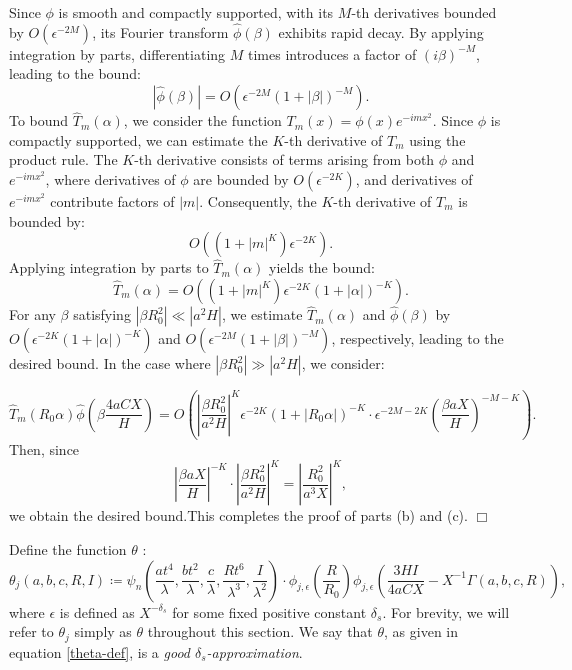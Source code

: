 \documentclass{article}
\newenvironment{proof}{\noindent {\bf Proof:}}{$\Box$ \vspace{2 ex}}
\begin{document}
\begin{proof}
Since $\phi$ is smooth and compactly supported, with its $M$-th derivatives bounded by $O(\epsilon^{-2M})$, its Fourier transform $\widehat{\phi}(\beta)$ exhibits rapid decay. By applying integration by parts, differentiating $M$ times introduces a factor of $(i\beta)^{-M}$, leading to the bound:
\begin{equation*}
|\widehat{\phi}(\beta)| = O\left(\epsilon^{-2M}(1 + |\beta|)^{-M}\right).
\end{equation*}
To bound $\widehat{T}_m(\alpha)$, we consider the function $T_m(x) = \phi(x)e^{-imx^2}$. Since $\phi$ is compactly supported, we can estimate the $K$-th derivative of $T_m$ using the product rule. The $K$-th derivative consists of terms arising from both $\phi$ and $e^{-imx^2}$, where derivatives of $\phi$ are bounded by $O(\epsilon^{-2K})$, and derivatives of $e^{-imx^2}$ contribute factors of $|m|$. Consequently, the $K$-th derivative of $T_m$ is bounded by:
\begin{equation*}
O\left((1 + |m|^K) \epsilon^{-2K}\right).
\end{equation*}
Applying integration by parts to $\widehat{T}_m(\alpha)$ yields the bound:
\begin{equation*}
\widehat{T}_m(\alpha) = O\left((1 + |m|^K) \epsilon^{-2K} (1 + |\alpha|)^{-K}\right).
\end{equation*}
For any $\beta$ satisfying $|\beta R_0^2|\ll |a^2H|$, we estimate $\widehat{T}_m(\alpha)$ and $\widehat{\phi}(\beta)$ by $O(\epsilon^{-2K}(1 + |\alpha|)^{-K})$ and $O(\epsilon^{-2M}(1 + |\beta|)^{-M})$, respectively, leading to the desired bound.  
In the case where $|\beta R_0^2|\gg|a^2H|$, we consider:

\begin{equation*}
\widehat{T}_m(R_0\alpha) \widehat{\phi}\left(\beta \frac{4aCX}{H}\right) = O\left(\left|\frac{\beta R_0^2}{a^2H}\right|^K \epsilon^{-2K} (1 + |R_0\alpha|)^{-K} \cdot \epsilon^{-2M-2K}\left(\frac{\beta aX}{H}\right)^{-M-K}\right).
\end{equation*}
Then, since
\begin{equation*}
\left|\frac{\beta aX}{H}\right|^{-K} \cdot \left|\frac{\beta R_0^2}{a^2H}\right|^K = \left|\frac{R_0^2}{a^3X}\right|^K,
\end{equation*}
we obtain the desired bound.This completes the proof of parts (b) and (c).
\end{proof}

Define the function $\theta$  :
\begin{equation}\label{theta-def} \theta_j(a, b, c, R, I) \coloneqq \psi_{n}\left(\frac{at^4}{\lambda}, \frac{bt^2}{\lambda}, \frac{c}{\lambda}, \frac{Rt^6}{\lambda^3}, \frac{I}{\lambda^2}\right) \cdot \phi_{j, \epsilon}\left(\frac{R}{R_0}\right) \phi_{j, \epsilon}\left(\frac{3HI}{4aCX} - X^{-1}\Gamma(a, b, c, R)\right), \end{equation}
where $\epsilon$ is defined as $X^{-\delta_s}$ for some fixed positive constant $\delta_s$. For brevity, we will refer to $\theta_j$ simply as $\theta$ throughout this section. We say that $\theta$, as given in equation \eqref{theta-def}, is a \textit{good $\delta_s$-approximation}.  
\end{document}
